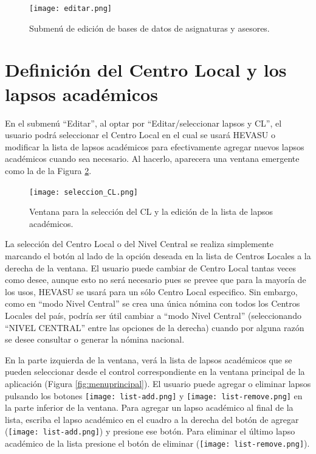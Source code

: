 \documentclass[letterpaper,12pt]{book}
\begin{document}
\begin{figure}[!ht]
  \centering
  \texttt{[image: editar.png]}
  \caption{Submenú de edición de bases de datos de asignaturas y asesores.}
  \label{fig:menueditar}
\end{figure}

\section{Definición del Centro Local y los lapsos académicos}

En el submenú ``Editar'', al optar por ``Editar/seleccionar lapsos y CL'', el usuario podrá seleccionar el Centro Local en el cual se usará HEVASU o modificar la lista de lapsos académicos para efectivamente agregar nuevos lapsos académicos cuando sea necesario. Al hacerlo, aparecera una ventana emergente como la de la Figura \ref{fig:seleccion_CL}.

\begin{figure}[!ht]
  \centering
  \texttt{[image: seleccion\_CL.png]}
  \caption{Ventana para la selección del CL y la edición de la lista de lapsos académicos.}
  \label{fig:seleccion_CL}
\end{figure}

La selección del Centro Local o del Nivel Central se realiza simplemente marcando el botón al lado de la opción deseada en la lista de Centros Locales a la derecha de la ventana. El usuario puede cambiar de Centro Local tantas veces como desee, aunque esto no será necesario pues se prevee que para la mayoría de los usos, HEVASU se usará para un sólo Centro Local especifico. Sin embargo, como en ``modo Nivel Central'' se crea una única nómina con todos los Centros Locales del país, podría ser útil cambiar a ``modo Nivel Central'' (seleccionando ``NIVEL CENTRAL'' entre las opciones de la derecha) cuando por alguna razón se desee consultar o generar la nómina nacional.

En la parte izquierda de la ventana, verá la lista de lapsos académicos que se pueden seleccionar desde el control correspondiente en la ventana principal de la aplicación (Figura \ref{fig:menuprincipal}). El usuario puede agregar o eliminar lapsos pulsando los botones \texttt{[image: list-add.png]} y \texttt{[image: list-remove.png]} en la parte inferior de la ventana. Para agregar un lapso académico al final de la lista, escriba el lapso académico en el cuadro a la derecha del botón de agregar (\texttt{[image: list-add.png]}) y presione ese botón. Para eliminar el último lapso académico de la lista presione el botón de eliminar (\texttt{[image: list-remove.png]}).
\end{document}
